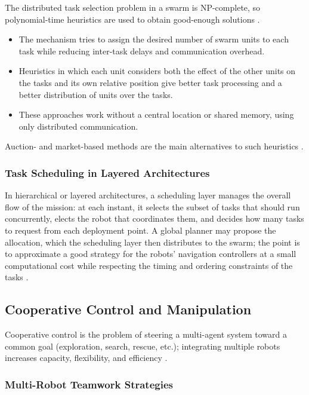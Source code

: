 The distributed task selection problem in a swarm is NP-complete, so
polynomial-time heuristics are used to obtain good-enough solutions
\cite{sahin2007swarm}.
\begin{itemize}
  \item {} The mechanism tries to assign the desired number
        of swarm units to each task while reducing inter-task delays and
        communication overhead.
  \item {} Heuristics in which each unit
        considers both the effect of the other units on the tasks and its own
        relative position give better task processing and a better distribution
        of units over the tasks.
  \item {} These approaches work without a central
        location or shared memory, using only distributed communication.
\end{itemize}
Auction- and market-based methods are the main alternatives to such heuristics
\cite{yan2013survey}.

\subsubsection{Task Scheduling in Layered Architectures}

In hierarchical or layered architectures, a scheduling layer manages the overall
flow of the mission: at each instant, it selects the subset of tasks that should
run concurrently, elects the robot that coordinates them, and decides how many
tasks to request from each deployment point. A global planner may propose the
allocation, which the scheduling layer then distributes to the swarm; the point
is to approximate a good strategy for the robots' navigation controllers at a
small computational cost while respecting the timing and ordering constraints of
the tasks \cite{yan2013survey,liu2019distributed}.

\subsection{Cooperative Control and Manipulation}

Cooperative control is the problem of steering a multi-agent system toward a
common goal (exploration, search, rescue, etc.); integrating multiple robots
increases capacity, flexibility, and efficiency \cite{yan2013survey}.

\subsubsection{Multi-Robot Teamwork Strategies}

